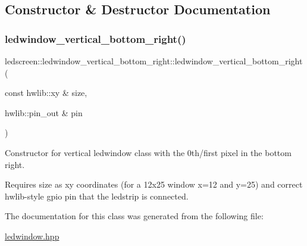 \subsection{Constructor \& Destructor Documentation}
\mbox{\label{classledscreen_1_1ledwindow__vertical__bottom__right_ac8f3b46311e8fcdc77c2c093e464ccfb}} 
\subsubsection{\texorpdfstring{ledwindow\+\_\+vertical\+\_\+bottom\+\_\+right()}{ledwindow\_vertical\_bottom\_right()}}
{\footnotesize\ttfamily ledscreen\+::ledwindow\+\_\+vertical\+\_\+bottom\+\_\+right\+::ledwindow\+\_\+vertical\+\_\+bottom\+\_\+right (\begin{DoxyParamCaption}\item[{const hwlib\+::xy \&}]{size,  }\item[{hwlib\+::pin\+\_\+out \&}]{pin }\end{DoxyParamCaption})\hspace{0.3cm}{\ttfamily [inline]}}



Constructor for vertical ledwindow class with the 0th/first pixel in the bottom right. 

Requires size as xy coordinates (for a 12x25 window x=12 and y=25) and correct hwlib-\/style gpio pin that the ledstrip is connected. 

The documentation for this class was generated from the following file\+:\begin{DoxyCompactItemize}
\item 
\hyperlink{ledwindow_8hpp}{ledwindow.\+hpp}\end{DoxyCompactItemize}
